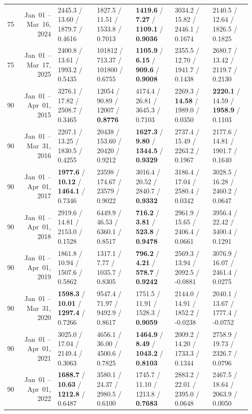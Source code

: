 \begin{longtable}{r r l l l l l}
75 & Jan~01 -- Mar~16, 2024 & 2445.3 / 13.60 / 1879.7 / 0.4616 & 1827.5 / 11.51 / 1533.8 / 0.7013 & \textbf{1419.6} / \textbf{7.27} / \textbf{1109.1} / \textbf{0.9036} & 3034.2 / 15.82 / 2446.1 / 0.1674 & 2140.5 / 12.64 / 1826.5 / 0.1825 \\
75 & Jan~01 -- Mar~17, 2025 & 2400.8 / 13.61 / 1993.2 / 0.5435 & 101812 / 713.37 / 101800 / 0.6755 & \textbf{1105.9} / \textbf{6.15} / \textbf{909.6} / \textbf{0.9008} & 2355.5 / 12.70 / 1941.7 / 0.1438 & 2680.7 / 13.42 / 2119.7 / 0.2130 \\
\midrule
90 & Jan~01 -- Apr~01, 2015 & 3276.1 / 17.82 / 2508.7 / 0.3465 & 12054 / 90.89 / 12007 / \textbf{0.8776} & 4174.4 / 26.81 / 3645.3 / 0.7103 & 2269.3 / \textbf{14.58} / 1989.0 / 0.0350 & \textbf{2220.1} / 14.59 / \textbf{1958.9} / 0.1103 \\
90 & Jan~01 -- Mar~31, 2016 & 2207.1 / 13.25 / 1830.5 / 0.4255 & 20438 / 153.60 / 20420 / 0.9212 & \textbf{1627.3} / \textbf{9.80} / \textbf{1344.5} / \textbf{0.9329} & 2737.4 / 15.49 / 2263.2 / 0.1967 & 2177.6 / 14.81 / 1901.7 / 0.1640 \\
90 & Jan~01 -- Apr~01, 2017 & \textbf{1977.6} / \textbf{10.12} / \textbf{1464.1} / 0.7346 & 23598 / 174.67 / 23579 / 0.9022 & 3016.4 / 20.52 / 2840.7 / \textbf{0.9332} & 3186.4 / 17.04 / 2580.4 / 0.0342 & 3028.5 / 16.28 / 2460.2 / 0.0647 \\
90 & Jan~01 -- Apr~01, 2018 & 2919.6 / 14.81 / 2153.0 / 0.1528 & 6449.9 / 46.53 / 6360.1 / 0.8517 & \textbf{716.2} / \textbf{3.81} / \textbf{523.8} / \textbf{0.9478} & 2961.9 / 15.65 / 2406.4 / 0.0661 & 3956.4 / 22.42 / 3400.4 / 0.1291 \\
90 & Jan~01 -- Apr~01, 2019 & 1861.8 / 10.94 / 1507.6 / 0.5862 & 1317.1 / 7.77 / 1035.7 / 0.8305 & \textbf{796.2} / \textbf{4.21} / \textbf{578.7} / \textbf{0.9242} & 2569.3 / 13.94 / 2092.5 / -0.0881 & 3076.9 / 16.07 / 2461.4 / 0.0275 \\
90 & Jan~01 -- Mar~31, 2020 & \textbf{1598.3} / \textbf{10.01} / \textbf{1297.4} / 0.7266 & 9547.4 / 71.97 / 9492.9 / 0.8617 & 1751.5 / 11.91 / 1528.3 / \textbf{0.9059} & 2144.0 / 14.91 / 1852.2 / -0.0238 & 2040.1 / 13.67 / 1777.4 / -0.0752 \\
90 & Jan~01 -- Apr~01, 2021 & 3025.0 / 17.04 / 2149.4 / 0.3063 & 4656.1 / 36.00 / 4500.6 / 0.7825 & \textbf{1464.9} / \textbf{8.49} / \textbf{1043.2} / \textbf{0.8103} & 2009.2 / 14.20 / 1733.3 / 0.1344 & 2758.9 / 19.73 / 2326.7 / 0.0796 \\
90 & Jan~01 -- Apr~01, 2022 & \textbf{1688.7} / \textbf{10.63} / \textbf{1212.8} / 0.6487 & 3580.1 / 24.37 / 2980.5 / 0.6100 & 1745.7 / 11.10 / 1213.8 / \textbf{0.7683} & 2883.2 / 22.01 / 2395.0 / 0.0648 & 2467.5 / 18.64 / 2063.9 / 0.0050 \\

\end{longtable}

